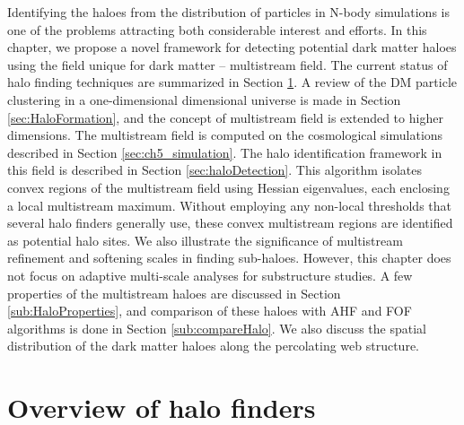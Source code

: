 Identifying the haloes from the distribution of particles in N-body simulations is one of the problems attracting both considerable interest and efforts. In this chapter, we propose a novel framework for detecting potential dark matter haloes using the field unique for dark matter  -- multistream field. The current status of halo finding techniques are summarized in Section \ref{sec:intro}. A review of the DM particle clustering in a one-dimensional dimensional universe is made in Section \ref{sec:HaloFormation}, and the concept of multistream field is extended to higher dimensions. The multistream field is computed on the cosmological simulations described in Section \ref{sec:ch5_simulation}. The halo identification framework in this field is described in Section \ref{sec:haloDetection}. This algorithm isolates convex regions of the multistream field using Hessian eigenvalues, each enclosing a local multistream maximum. Without employing any non-local thresholds that several halo finders generally use, these convex multistream regions are identified as potential halo sites. We also illustrate the significance of multistream refinement and softening scales in finding sub-haloes. However, this chapter does not focus on adaptive multi-scale analyses for substructure studies. A few properties of the multistream haloes are discussed in Section \ref{sub:HaloProperties}, and comparison of these haloes with AHF and FOF algorithms is done in Section \ref{sub:compareHalo}. We also discuss the spatial distribution of the dark matter haloes along the percolating web structure.


\section{Overview of halo finders} 
\label{sec:intro}

